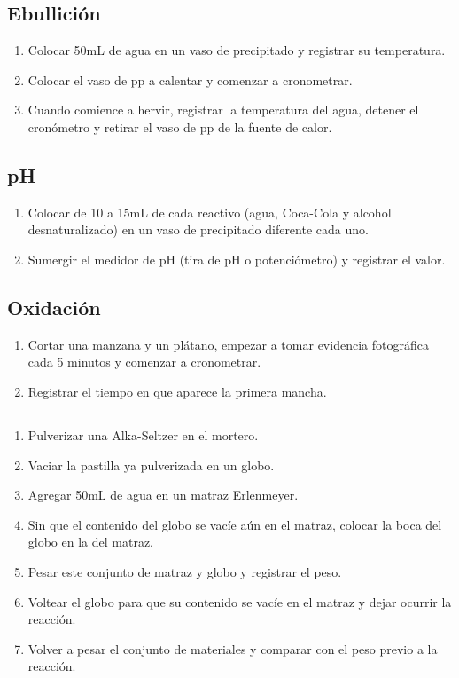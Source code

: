 \subsection{Ebullición}
\begin{enumerate}
    \item Colocar 50mL de agua en un vaso de precipitado y registrar su temperatura.
    \item Colocar el vaso de pp a calentar y comenzar a cronometrar.
    \item Cuando comience a hervir, registrar la temperatura del agua, detener el cronómetro y retirar el vaso de pp de la fuente de calor.
\end{enumerate}

\subsection{pH}
\begin{enumerate}
    \item Colocar de 10 a 15mL de cada reactivo (agua, Coca-Cola y alcohol desnaturalizado) en un vaso de precipitado diferente cada uno.
    \item Sumergir el medidor de pH (tira de pH o potenciómetro) y registrar el valor.  
\end{enumerate}

\subsection{Oxidación}
\begin{enumerate}
    \item Cortar una manzana y un plátano, empezar a tomar evidencia fotográfica cada 5 minutos y comenzar a cronometrar.
    \item Registrar el tiempo en que aparece la primera mancha.
\end{enumerate}

\subsection{}
\begin{enumerate}
    \item Pulverizar una Alka-Seltzer en el mortero.
    \item Vaciar la pastilla ya pulverizada en un globo.
    \item Agregar 50mL de agua en un matraz Erlenmeyer.
    \item Sin que el contenido del globo se vacíe aún en el matraz, colocar la boca del globo en la del matraz.
    \item Pesar este conjunto de matraz y globo y registrar el peso.
    \item Voltear el globo para que su contenido se vacíe en el matraz y dejar ocurrir la reacción.
    \item Volver a pesar el conjunto de materiales y comparar con el peso previo a la reacción.
\end{enumerate}